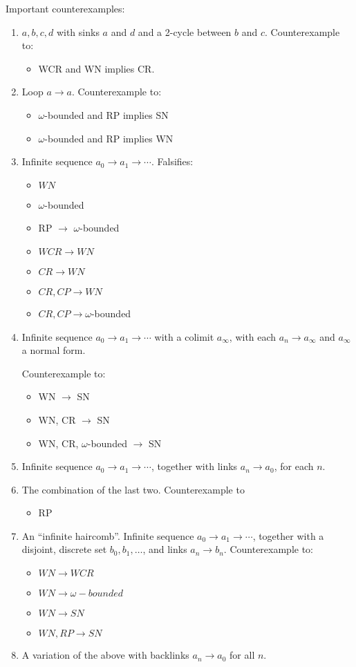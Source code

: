 \documentclass{scrartcl}
\begin{document}
Important counterexamples:
\begin{enumerate}
  \item $a,b,c,d$ with sinks $a$ and $d$ and a 2-cycle between $b$ and $c$.
  Counterexample to:
  \begin{itemize}
      \item WCR and WN implies CR.
  \end{itemize}
  \item Loop $a \to a$.
  Counterexample to:
  \begin{itemize}
    \item $\omega$-bounded and RP implies SN
    \item $\omega$-bounded and RP implies WN
  \end{itemize}
  \item Infinite sequence $a_0 \to a_1 \to \cdots$. Falsifies:
  \begin{itemize}
    \item $WN$
    \item $\omega$-bounded
    \item RP $\to$ $\omega$-bounded
    \item $WCR \to WN$
    \item $CR \to WN$
    \item $CR, CP \to WN$
    \item $CR, CP \to \omega$-bounded
  \end{itemize}
  \item Infinite sequence $a_0 \to a_1 \to \cdots$ with a colimit $a_\infty$,
  with each $a_n \to a_\infty$ and $a_\infty$ a normal form.

  Counterexample to:
  \begin{itemize}
    \item WN $\to$ SN
    \item WN, CR $\to$ SN
    \item WN, CR, $\omega$-bounded $\to$ SN
  \end{itemize}

  \item Infinite sequence $a_0 \to a_1 \to \cdots$, together with links
  $a_n \to a_0$, for each $n$.
  \item The combination of the last two.
  Counterexample to
  \begin{itemize}
    \item RP
  \end{itemize}
  \item An ``infinite haircomb''. Infinite sequence $a_0 \to a_1 \to \cdots$, together with
  a disjoint, discrete set $b_0, b_1, \dots$, and links $a_n \to b_n$.
  Counterexample to:
  \begin{itemize}
    \item $WN\to WCR$
    \item $WN\to \omega-bounded$
    \item $WN \to SN$
    \item $WN,RP \to SN$
  \end{itemize}
  \item A variation of the above with backlinks $a_n \to a_0$ for all $n$.
\end{enumerate}
\newpage
\newpage
\end{document}
